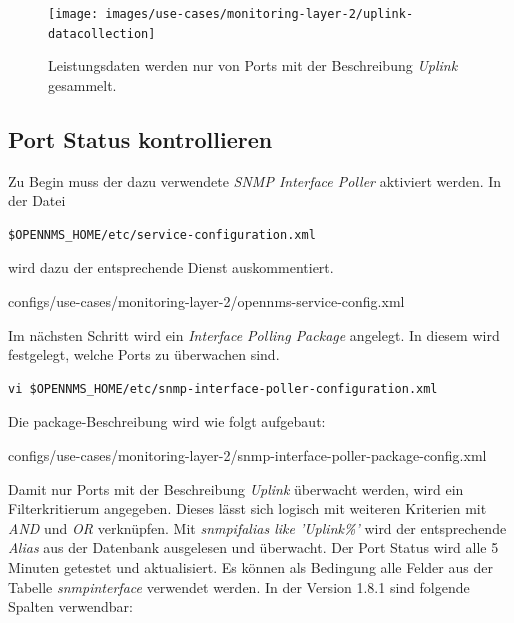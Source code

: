 \begin{figure}[H]
	\centering
	\texttt{[image: images/use-cases/monitoring-layer-2/uplink-datacollection]}
	\caption{Leistungsdaten werden nur von Ports mit der Beschreibung \textit{Uplink} gesammelt.}
	\label{pic:uplink-datacollection}
\end{figure}

\subsection{Port Status kontrollieren}
Zu Begin muss der dazu verwendete \textit{SNMP Interface Poller} aktiviert werden. In der Datei

\begin{lstlisting}[numbers=none]
$OPENNMS_HOME/etc/service-configuration.xml
\end{lstlisting}

wird dazu der entsprechende Dienst auskommentiert.


  {configs/use-cases/monitoring-layer-2/opennms-service-config.xml}

Im nächsten Schritt wird ein \emph{Interface Polling Package} angelegt. In diesem wird festgelegt, welche Ports zu überwachen sind.

\begin{lstlisting}[numbers=none]
vi $OPENNMS_HOME/etc/snmp-interface-poller-configuration.xml
\end{lstlisting}

Die package-Beschreibung wird wie folgt aufgebaut:


  {configs/use-cases/monitoring-layer-2/snmp-interface-poller-package-config.xml}

Damit nur Ports mit der Beschreibung \textit{Uplink} überwacht werden, wird ein Filterkritierum angegeben. Dieses lässt sich logisch mit weiteren Kriterien mit \textit{AND} und \textit{OR} verknüpfen. Mit \textit{snmpifalias like 'Uplink\%'} wird der entsprechende \textit{Alias} aus der Datenbank ausgelesen und überwacht. Der Port Status wird alle 5 Minuten getestet und aktualisiert. Es können als Bedingung alle Felder aus der Tabelle \textit{snmpinterface} verwendet werden. In der Version 1.8.1 sind folgende Spalten verwendbar:

